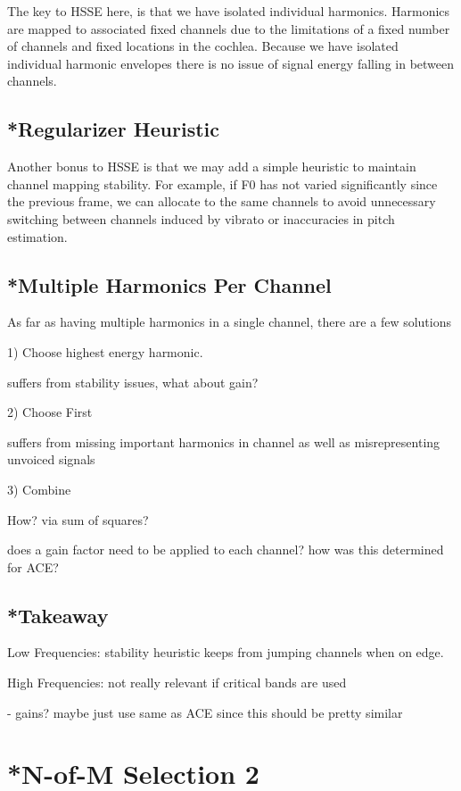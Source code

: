 \documentclass [11pt, proquest] {uwthesis}[2015/03/03]
\begin{document}
The key to HSSE here, is that we have isolated individual harmonics.  Harmonics are mapped to associated fixed channels due to the limitations of a fixed number of channels and fixed locations in the cochlea.  Because we have isolated individual harmonic envelopes there is no issue of signal energy falling in between channels.

\subsection{*Regularizer Heuristic}

Another bonus to HSSE is that we may add a simple heuristic to maintain channel mapping stability.  For example, if F0 has not varied significantly since the previous frame, we can allocate to the same channels to avoid unnecessary switching between channels induced by vibrato or inaccuracies in pitch estimation.

\subsection{*Multiple Harmonics Per Channel}
As far as having multiple harmonics in a single channel, there are a few solutions

1) Choose highest energy harmonic.

suffers from stability issues, what about gain?

2) Choose First

suffers from missing important harmonics in channel as well as misrepresenting unvoiced signals

3) Combine

How?  via sum of squares?

does a gain factor need to be applied to each channel?  how was this determined for ACE?

\subsection{*Takeaway}

Low Frequencies: stability heuristic keeps from jumping channels when on edge.

High Frequencies: not really relevant if critical bands are used

- gains?  maybe just use same as ACE since this should be pretty similar
 

\section{*N-of-M Selection 2}
\end{document}
